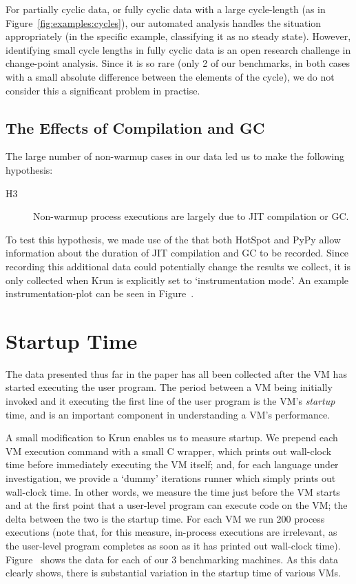 \documentclass[preprint,numbers,10pt]{sigplanconf}
\newcommand{\krun}{Krun\xspace}
\begin{document}
For partially cyclic data, or fully cyclic data with a large cycle-length (as in
Figure~\ref{fig:examples:cycles}), our automated analysis handles the situation
appropriately (in the specific example, classifying it as no steady state).
However, identifying small cycle lengths in fully cyclic data is
an open research challenge in change-point analysis. Since it is so rare (only 2
of our benchmarks, in both cases with a small absolute difference between the
elements of the cycle), we do not consider this a significant problem in practise.


\subsection{The Effects of Compilation and GC}
\label{sec:deepdive}

The large number of non-warmup cases in our data led us to make the following hypothesis:
\begin{description}
  \item[H3] Non-warmup process executions are largely due to JIT compilation or GC.
\end{description}
To test this hypothesis, we made use of the that both HotSpot and PyPy allow
information about the duration of JIT compilation and GC to be recorded. Since
recording this additional data could potentially change the results we collect,
it is only collected when \krun is explicitly set to `instrumentation mode'. An
example instrumentation-plot can be seen in Figure~.



\section{Startup Time}
\label{sec:startup}

The data presented thus far in the paper has all been collected after the VM has
started executing the user program. The period between a VM being initially
invoked and it executing the first line of the user program is the VM's \emph{startup} time,
and is an important component in understanding a VM's performance.

A small modification to \krun enables us to measure startup. We prepend each VM
execution command with a small C wrapper, which prints out wall-clock time
before immediately executing the VM itself; and, for each language under
investigation, we provide a `dummy' iterations runner which simply prints out
wall-clock time. In other words, we measure the time just before the VM starts
and at the first point that a user-level program can execute code on the VM; the
delta between the two is the startup time. For each VM we run 200 process
executions (note that, for this measure, in-process executions are irrelevant,
as the user-level program completes as soon as it has printed out wall-clock
time). Figure~ shows the data for each of our
3 benchmarking machines. As this data clearly shows, there is substantial
variation in the startup time of various VMs.
\end{document}
